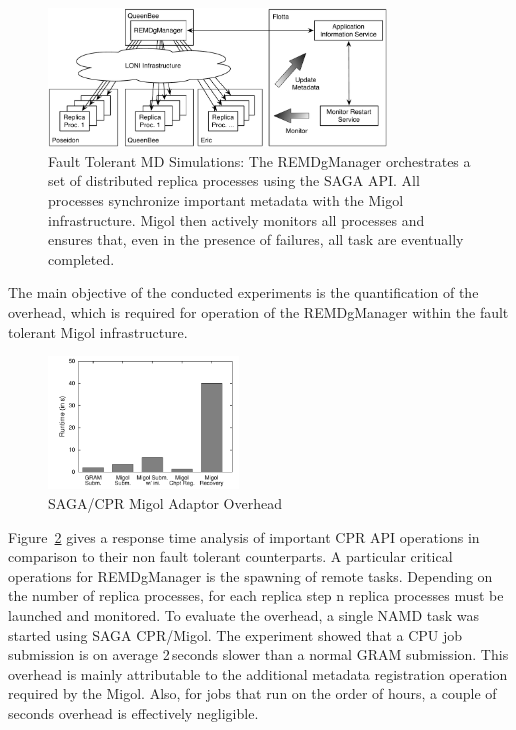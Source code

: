 \documentclass[times, 10pt, twocolumn]{article}
\begin{document}
\begin{figure}[t]
    \centering
        \includegraphics[width=0.8\textwidth]{saga-taskfarming}
        \caption{Fault Tolerant MD Simulations: The
          REMDgManager orchestrates a set of distributed replica
          processes using the SAGA API. All processes synchronize
          important metadata with the Migol infrastructure. Migol then
          actively monitors all processes and ensures that, even in
          the presence of failures, all task are eventually
          completed.}
    \label{fig:saga-taskfarming}
  \end{figure} 

The main objective of the conducted experiments is the quantification of the overhead, which
is required for operation of the REMDgManager within the fault tolerant Migol infrastructure. 
\begin{figure}[ht]
    \centering
        \includegraphics[width=0.45\textwidth]{performance/perf_submission.pdf}
    \caption{SAGA/CPR Migol Adaptor Overhead}
    \label{fig:performance_perf_submission}
\end{figure}           
Figure~\ref{fig:performance_perf_submission} gives a response time analysis of
important CPR API operations in comparison to their non fault tolerant
counterparts. A particular critical operations for REMDgManager is the
spawning of remote tasks. Depending on the number of replica
processes, for each replica step n replica processes must be launched
and monitored.  To evaluate the overhead, a single NAMD task was
started using SAGA CPR/Migol.  The experiment showed that a CPU job
submission is on average 2\,seconds slower than a normal GRAM
submission. This overhead is mainly attributable to the additional
metadata registration operation required by the Migol. Also, for jobs
that run on the order of hours, a couple of seconds overhead is
effectively negligible.
\end{document}
